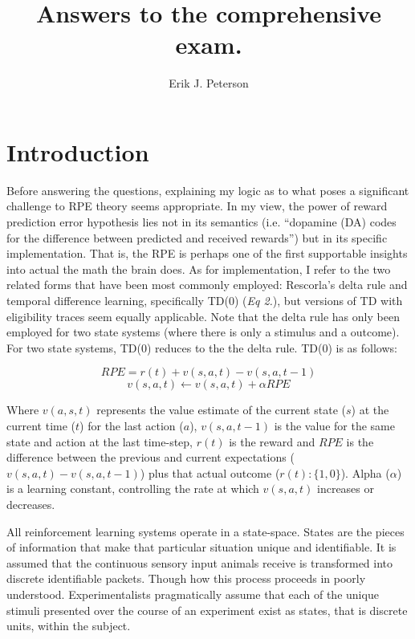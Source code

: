 \documentclass[doc]{apa}        %
\title{Answers to the comprehensive exam.}
\author{Erik J. Peterson} \affiliation{Dept. of Psychology \\ Colorado State University \\ Fort Collins, CO}
\begin{document}
 
\maketitle

\section{Introduction} %
\label{sec:introduction}

Before answering the questions, explaining my logic as to what poses a significant challenge to RPE theory seems appropriate.  In my view, the power of reward prediction error hypothesis lies not in its semantics (i.e. ``dopamine (DA) codes for the difference between predicted and received rewards'') but in its specific implementation.  That is, the RPE is perhaps one of the first supportable insights into actual the math the brain does. As for implementation, I refer to the two related forms that have been most commonly employed: Rescorla's delta rule and temporal difference learning, specifically TD(0) (\emph{Eq 2.}), but versions of TD with eligibility traces seem equally applicable.  Note that the delta rule has only been employed for two state systems (where there is only a stimulus and a outcome).  For two state systems, TD(0) reduces to the the delta rule.  TD(0) is as follows:

\begin{equation} RPE = r(t) + v(s,a,t) - v(s,a,t-1) 	\end{equation}
\begin{equation} v(s,a,t) \leftarrow v(s,a,t) + {\alpha}RPE  	\end{equation}	

Where $v(a,s,t)$ represents the value estimate of the current state ($s$) at the current time ($t$) for the last action ($a$), $v(s,a,t-1)$ is the value for the same state and action at the last time-step, $r(t)$ is the reward and $RPE$ is the difference between the previous and current expectations ($v(s,a,t) - v(s,a,t-1)$) plus that actual outcome ($r(t): \{1,0\}$).  Alpha ($\alpha$) is a learning constant, controlling the rate at which $v(s,a,t)$ increases or decreases.  

All reinforcement learning systems operate in a state-space. States are the pieces of information that make that particular situation unique and identifiable.  It is assumed that the continuous sensory input animals receive is transformed into discrete identifiable packets.  Though how this process proceeds in poorly understood.  Experimentalists pragmatically assume that each of the unique stimuli presented over the course of an experiment exist as states, that is discrete units, within the subject.  
\end{document}
